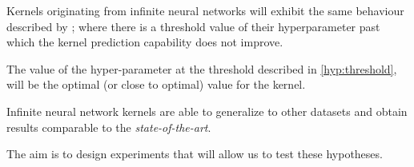 \begin{hypothesis}\label{hyp:threshold}
    Kernels originating from infinite neural networks will exhibit the same
    behaviour described by
    \textcite{frenayParameterinsensitiveKernelExtreme2011}; where there is a
    threshold value of their hyperparameter past which the kernel prediction
    capability does not improve.
\end{hypothesis}

\begin{hypothesis}
    The value of the hyper-parameter at the threshold described in
    \ref{hyp:threshold}, will be the optimal (or close to optimal) value for the
    kernel.
\end{hypothesis}

\begin{hypothesis}
    Infinite neural network kernels are able to generalize to other datasets and
    obtain results comparable to the \emph{state-of-the-art}.
\end{hypothesis}

The aim is to design experiments that will allow us to test these hypotheses.
